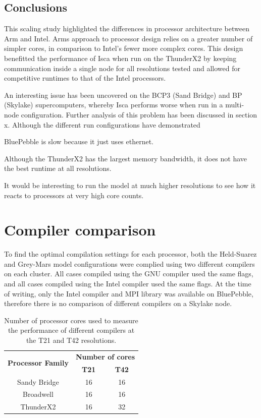\documentclass[a4paper,11pt]{report}
\begin{document}
\subsection{Conclusions}
This scaling study highlighted the differences in processor architecture between Arm and Intel. Arms approach to processor design relies on a greater number of simpler cores, in comparison to Intel's fewer more complex cores. This design benefitted the performance of Isca when run on the ThunderX2 by keeping communication inside a single node for all resolutions tested and allowed for competitive runtimes to that of the Intel processors.
\par
An interesting issue has been uncovered on the BCP3 (Sand Bridge) and BP (Skylake) supercomputers, whereby Isca performs worse when run in a multi-node configuration. Further analysis of this problem has been discussed in section x. Although the different run configurations have demonstrated 
\par
BluePebble is slow because it just uses ethernet. 

Although the ThunderX2 has the largest memory bandwidth, it does not have the best runtime at all resolutions. 

It would be interesting to run the model at much higher resolutions to see how it reacts to processors at very high core counts.





\section{Compiler comparison}
To find the optimal compilation settings for each processor, both the Held-Suarez and Grey-Mars model configurations were complied using two different compilers on each cluster. All cases compiled using the GNU compiler used the same flags, and all cases compiled using the Intel compiler used the same flags. At the time of writing, only the Intel compiler and MPI library was available on BluePebble, therefore there is no comparison of different compilers on a Skylake node. 
\par

\begin{table}[htp]
\caption{Number of processor cores used to measure the performance of different compilers at the T21 and T42 resolutions.}
\begin{center}
\begin{tabular}{c c c}
\toprule
\multirow{2}{*}{\textbf{Processor Family}}	&	\multicolumn{2}{c}{\textbf{Number of cores}}	\\
							 		\cmidrule(lr){2-3}
								& 	\textbf{T21} 	&	\textbf{T42}			\\
\midrule
Sandy Bridge						&	16			&	16					\\
Broadwell							&	16			&	16					\\
ThunderX2						&	16			&	32					\\
\bottomrule
\end{tabular}
\end{center}
\label{tbl:-compiler-cores}
\end{table}%
\end{document}
